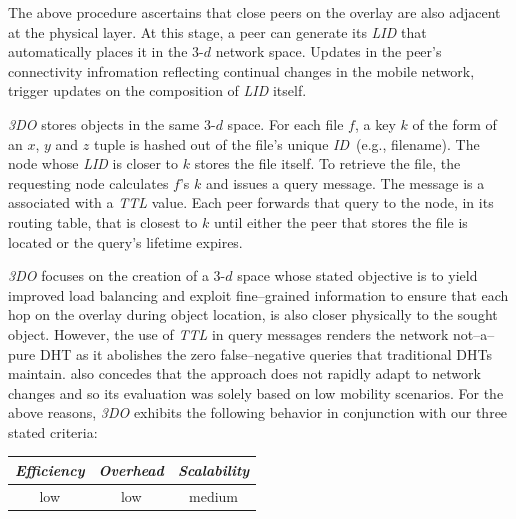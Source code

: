 The above procedure ascertains that close peers on the
overlay are also adjacent at the physical layer. 
At this stage, a peer can generate its \emph{LID}
that automatically places it in the $3$-$d$ network space.
Updates in the peer's connectivity infromation 
reflecting continual changes in the mobile network,
trigger updates on the composition of \emph{LID} itself.

\emph{3DO} stores objects in the same $3$-$d$ space. For each
file $f$, a key $k$ of the form of an $x$, $y$ and $z$ tuple
is hashed out of the file's unique \emph{ID}~(e.g., filename).
The node whose \emph{LID} is closer to $k$ stores the
file itself.
To retrieve the file, the requesting node calculates $f$'s $k$
and issues a query message. 
The message is a associated with a \emph{TTL} value. 
Each peer forwards that query to the node,
in its routing table, that is closest to $k$ until either the peer
that stores the file is located or the query's lifetime expires.

\emph{3DO} focuses on
the creation of a $3$-$d$ space whose stated objective is to
yield improved load balancing 
and exploit fine--grained information to ensure
that each hop on the overlay during object location, 
is also closer physically to the sought object.
However, the use of \emph{TTL} in query messages
renders the network not--a--pure DHT as it abolishes 
the zero false--negative queries that traditional DHTs maintain.
\cite{AOS2014} also concedes that the approach
does not rapidly adapt to network changes and so
its evaluation was solely based on low mobility scenarios. 
For the above reasons, \emph{3DO} exhibits the following behavior 
in conjunction with our three stated criteria:
\begin{center}
{\footnotesize
\begin{tabular}{ccc}
\emph{Efficiency} & \emph{Overhead} & \emph{Scalability} \\
\hline
% 
low &
% 
low &
% 
medium
\end{tabular}
}
\end{center}


